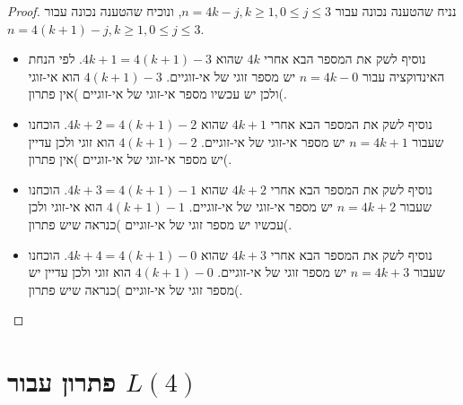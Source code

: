 \begin{proof}
נניח שהטענה נכונה עבור 
$n=4k-j, k\geq 1, 0\leq j\leq 3$,
ונוכיח שהטענה נכונה עבור
$n=4(k+1)-j, k\geq 1, 0\leq j\leq 3$.
\begin{itemize}
\item
נוסיף לשק את המספר הבא אחרי 
$4k$
שהוא
$4k+1=4(k+1)-3$.
לפי הנחת האינדוקציה עבור  
$n=4k-0$
יש מספר זוגי של אי-זוגיים. 
$4(k+1)-3$
הוא אי-זוגי ולכן יש עכשיו מספר אי-זוגי של אי-זוגיים )אין פתרון(.

\item
נוסיף לשק את המספר הבא אחרי 
$4k+1$
שהוא
$4k+2=4(k+1)-2$.
הוכחנו שעבור
$n=4k+1$
יש מספר אי-זוגי של אי-זוגיים. 
$4(k+1)-2$
הוא זוגי ולכן עדיין יש מספר אי-זוגי של אי-זוגיים )אין פתרון(.

\item
נוסיף לשק את המספר הבא אחרי 
$4k+2$
שהוא
$4k+3=4(k+1)-1$.
הוכחנו שעבור
$n=4k+2$
יש מספר אי-זוגי של אי-זוגיים. 
$4(k+1)-1$
הוא אי-זוגי ולכן עכשיו יש מספר זוגי של אי-זוגיים )כנראה שיש פתרון(.

\item
נוסיף לשק את המספר הבא אחרי 
$4k+3$
שהוא
$4k+4=4(k+1)-0$.
הוכחנו שעבור
$n=4k+3$
יש מספר זוגי של אי-זוגיים. 
$4(k+1)-0$
הוא זוגי ולכן עדיין יש מספר זוגי של אי-זוגיים )כנראה שיש פתרון(.

\end{itemize}
\end{proof}


\section{פתרון עבור
$L(4)$}\label{s.langford-four}

